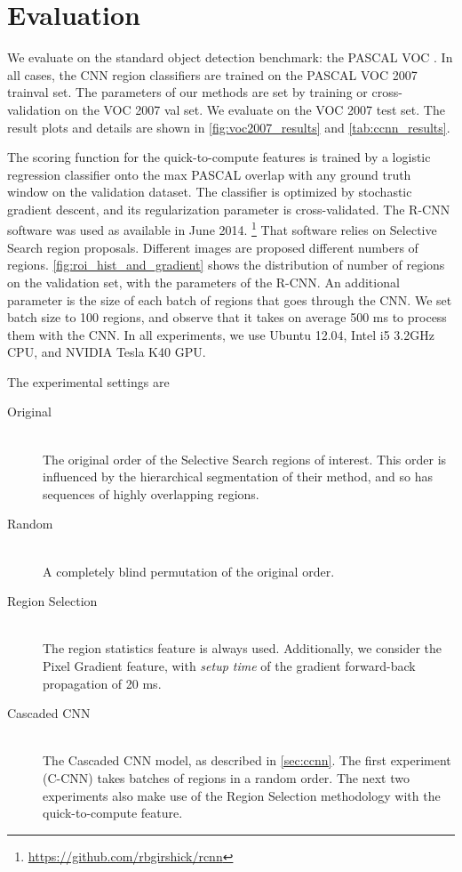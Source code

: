 \section{Evaluation}\label{sec:ccnn_evaluation}

We evaluate on the standard object detection benchmark: the PASCAL VOC \cite{pascal-voc-2010}.
In all cases, the CNN region classifiers are trained on the PASCAL VOC 2007 trainval set.
The parameters of our methods are set by training or cross-validation on the VOC 2007 val set.
We evaluate on the VOC 2007 test set.
The result plots and details are shown in \autoref{fig:voc2007_results} and \autoref{tab:ccnn_results}.

The scoring function for the quick-to-compute features is trained by a logistic regression classifier onto the max PASCAL overlap with any ground truth window on the validation dataset.
The classifier is optimized by stochastic gradient descent, and its regularization parameter is cross-validated.
The R-CNN software was used as available in June 2014.
\footnote{\url{https://github.com/rbgirshick/rcnn}}
That software relies on Selective Search \cite{Uijlings-IJCV-2013} region proposals.
Different images are proposed different numbers of regions.
\autoref{fig:roi_hist_and_gradient} shows the distribution of number of regions on the validation set, with the parameters of the R-CNN.
An additional parameter is the size of each batch of regions that goes through the CNN.
We set batch size to 100 regions, and observe that it takes on average 500 ms to process them with the CNN.
In all experiments, we use Ubuntu 12.04, Intel i5 3.2GHz CPU, and NVIDIA Tesla K40 GPU.





The experimental settings are
\begin{description}
  \item[Original] \hfill \\
  The original order of the Selective Search regions of interest.
  This order is influenced by the hierarchical segmentation of their method, and so has sequences of highly overlapping regions.

  \item[Random] \hfill \\
  A completely blind permutation of the original order.

  \item[Region Selection] \hfill \\
  The region statistics feature is always used.
  Additionally, we consider the Pixel Gradient feature, with \emph{setup time} of the gradient forward-back propagation of 20 ms.

  \item[Cascaded CNN] \hfill \\
  The Cascaded CNN model, as described in \autoref{sec:ccnn}.
  The first experiment (C-CNN) takes batches of regions in a random order.
  The next two experiments also make use of the Region Selection methodology with the quick-to-compute feature.
\end{description}


